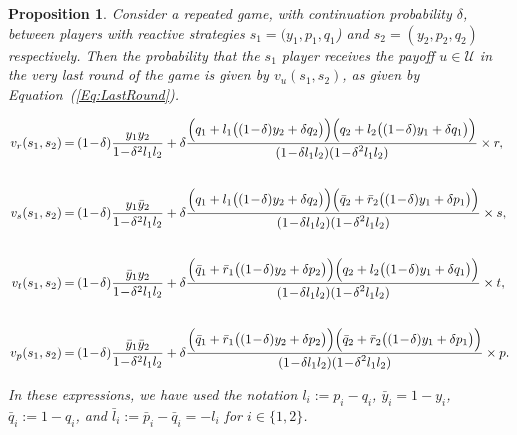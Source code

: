 \documentclass[11pt]{article}
\theoremstyle{plainCl1}
\newtheorem{Prop}{Proposition}
\theoremstyle{plainCl2}
\begin{document}
\begin{Prop}\label{proposition:last_round} Consider a repeated game, with
continuation probability $\delta$, between players with reactive strategies
$s_1\!=\!(y_1, p_1, q_1$)  and $s_2\!=\!(y_2,p_2,q_2)$ respectively. Then
the probability that the $s_1$ player receives the payoff $u\!\in\!
\mathcal{U}$ in the very last round of the game is given by
$v_{u}(s_1,s_2)$, as given by Equation~(\ref{Eq:LastRound}).

\begin{equation} \label{Eq:LastRound}
  \setlength{\arraycolsep}{1pt}
  \begin{array}{rcl}

  v_{r}(s_1,s_2) &= &\displaystyle (1\!-\!\delta)\frac{y_1y_2}{1\!-\!\delta^2 l_1 l_2}+\delta \frac{\Big(q_1+l_1\big((1\!-\!\delta)y_2+\delta q_2\big)\Big) \Big(q_2+l_2\big((1\!-\!\delta)y_1+\delta q_1\big)\Big)}
  {\displaystyle(1\!-\!\delta l_1l_2)(1\!-\!\delta^2 l_1 l_2)} \times r,\\[1cm]

  v_{s}(s_1,s_2) &= &\displaystyle (1\!-\!\delta)\frac{y_1\bar{y}_2}{1\!-\!\delta^2 l_1 l_2}+\delta \frac{\Big(q_1+l_1\big((1\!-\!\delta)y_2+\delta q_2\big)\Big) \Big(\bar{q}_2+\bar{r}_2\big((1\!-\!\delta)y_1+\delta p_1\big)\Big)}
  {\displaystyle(1\!-\!\delta l_1l_2)(1\!-\!\delta^2 l_1 l_2)} \times s,\\[1cm]

  v_{t}(s_1,s_2) &= &\displaystyle (1\!-\!\delta)\frac{\bar{y}_1y_2}{1\!-\!\delta^2 l_1 l_2}+\delta \frac{\Big(\bar{q}_1+\bar{r}_1\big((1\!-\!\delta)y_2+\delta p_2\big)\Big) \Big(q_2+l_2\big((1\!-\!\delta)y_1+\delta q_1\big)\Big)}
  {\displaystyle(1\!-\!\delta l_1l_2)(1\!-\!\delta^2 l_1 l_2)} \times t,\\[1cm]

  v_{p}(s_1,s_2) &= &\displaystyle (1\!-\!\delta)\frac{\bar{y}_1\bar{y}_2}{1\!-\!\delta^2 l_1 l_2}+\delta \frac{\Big(\bar{q}_1+\bar{r}_1\big((1\!-\!\delta)y_2+\delta p_2\big)\Big) \Big(\bar{q}_2+\bar{r}_2\big((1\!-\!\delta)y_1+\delta p_1\big)\Big)}
  {\displaystyle(1\!-\!\delta l_1l_2)(1\!-\!\delta^2 l_1 l_2)} \times p.
  \end{array}
\end{equation}

In these expressions, we have used the notation $l_i:=p_i\!-\!q_i$,
$\bar{y}_i\!=\!1\!-\!y_i$, $\bar{q}_i:=1\!-\!q_i$, and
$\bar{l}_i:=\bar{p}_i\!-\!\bar{q}_i=-l_i$ for $i\!\in\!\{1,2\}$.
\end{Prop}
\end{document}
